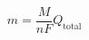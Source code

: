\documentclass[preview]{standalone}
\begin{document}
\[m = \frac{M}{nF} Q_\text{total} \tag{1.11}\]
\end{document}
